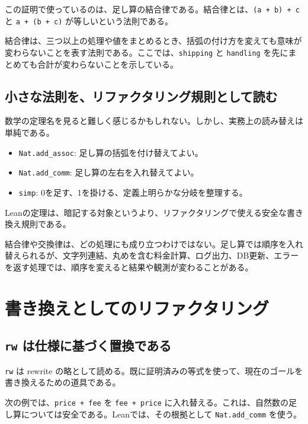 この証明で使っているのは、足し算の結合律である。結合律とは、\texttt{(a + b) + c} と \texttt{a + (b + c)} が等しいという法則である。

\begin{definitionbox}
結合律は、三つ以上の処理や値をまとめるとき、括弧の付け方を変えても意味が変わらないことを表す法則である。ここでは、\texttt{shipping} と \texttt{handling} を先にまとめても合計が変わらないことを示している。
\end{definitionbox}

\subsection{小さな法則を、リファクタリング規則として読む}

数学の定理名を見ると難しく感じるかもしれない。しかし、実務上の読み替えは単純である。

\begin{itemize}
\item \texttt{Nat.add\_assoc}: 足し算の括弧を付け替えてよい。
\item \texttt{Nat.add\_comm}: 足し算の左右を入れ替えてよい。
\item \texttt{simp}: 0を足す、1を掛ける、定義上明らかな分岐を整理する。
\end{itemize}

Leanの定理は、暗記する対象というより、リファクタリングで使える安全な書き換え規則である。

\begin{warningbox}
結合律や交換律は、どの処理にも成り立つわけではない。足し算では順序を入れ替えられるが、文字列連結、丸めを含む料金計算、ログ出力、DB更新、エラーを返す処理では、順序を変えると結果や観測が変わることがある。
\end{warningbox}

\section{書き換えとしてのリファクタリング}

\subsection{\texttt{rw} は仕様に基づく置換である}

\texttt{rw} は rewrite の略として読める。既に証明済みの等式を使って、現在のゴールを書き換えるための道具である。

次の例では、\texttt{price + fee} を \texttt{fee + price} に入れ替える。これは、自然数の足し算については安全である。Leanでは、その根拠として \texttt{Nat.add\_comm} を使う。

